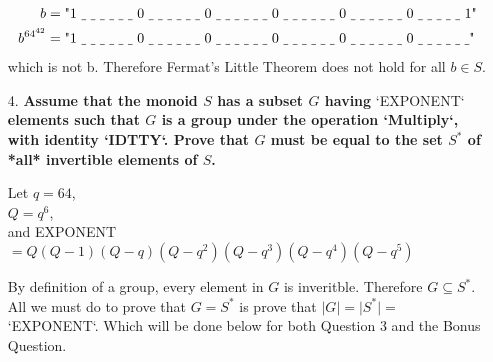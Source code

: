 \documentclass[12pt,letterpaper]{article}
\begin{document}
\begin{itemize}
        \begin{align*}
            b&=\text{"1 \underline{\space} \underline{\space} \underline{\space} \underline{\space} \underline{\space} \underline{\space} 0 \underline{\space} \underline{\space} \underline{\space} \underline{\space} \underline{\space} \underline{\space} 0 \underline{\space} \underline{\space} \underline{\space} \underline{\space} \underline{\space} \underline{\space} 0 \underline{\space} \underline{\space} \underline{\space} \underline{\space} \underline{\space} \underline{\space} 0 \underline{\space} \underline{\space} \underline{\space} \underline{\space} \underline{\space} \underline{\space} 0 \underline{\space} \underline{\space} \underline{\space} \underline{\space} \underline{\space} 1"}\\
            b^{64^{42}}&=\text{"1 \underline{\space} \underline{\space} \underline{\space} \underline{\space} \underline{\space} \underline{\space} 0 \underline{\space} \underline{\space} \underline{\space} \underline{\space} \underline{\space} \underline{\space} 0 \underline{\space} \underline{\space} \underline{\space} \underline{\space} \underline{\space} \underline{\space} 0 \underline{\space} \underline{\space} \underline{\space} \underline{\space} \underline{\space} \underline{\space} 0 \underline{\space} \underline{\space} \underline{\space} \underline{\space} \underline{\space} \underline{\space} 0 \underline{\space} \underline{\space} \underline{\space} \underline{\space} \underline{\space} \underline{\space}"}
        \end{align*}
        which is not b. Therefore Fermat's Little Theorem does not hold for all $b\in S$.
        
    \item [4.] \textbf{Assume that the monoid $S$ has a subset $G$ having} `EXPONENT` \textbf{elements such that $G$ is a group under the operation `Multiply`, with identity `IDTTY`.  Prove that $G$ must be equal to the set $S^*$ of *all* invertible elements of $S$.}
        
        Let $q=64$,\\
        $Q=q^6$,\\
       and EXPONENT $=Q(Q-1)(Q-q)(Q-q^2)(Q-q^3)(Q-q^4)(Q-q^5)$
        
        By definition of a group, every element in $G$ is inveritble. Therefore $G \subseteq S^*$. All we must do to prove that $G=S^*$ is prove that $\lvert G\rvert = \lvert S^*\rvert = $ `EXPONENT`. Which will be done below for both Question 3 and the Bonus Question.
        

\end{itemize}
\end{document}
